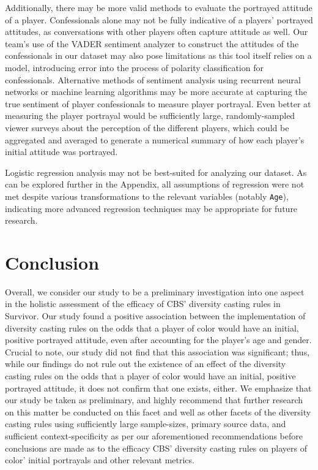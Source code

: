 \documentclass[
  letterpaper,
  DIV=11,
  numbers=noendperiod,
  oneside]{scrartcl}
\begin{document}
Additionally, there may be more valid methods to evaluate the portrayed
attitude of a player. Confessionals alone may not be fully indicative of
a players' portrayed attitudes, as conversations with other players
often capture attitude as well. Our team's use of the VADER sentiment
analyzer to construct the attitudes of the confessionals in our dataset
may also pose limitations as this tool itself relies on a model,
introducing error into the process of polarity classification for
confessionals. Alternative methods of sentiment analysis using recurrent
neural networks or machine learning algorithms may be more accurate at
capturing the true sentiment of player confessionals to measure player
portrayal. Even better at measuring the player portrayal would be
sufficiently large, randomly-sampled viewer surveys about the perception
of the different players, which could be aggregated and averaged to
generate a numerical summary of how each player's initial attitude was
portrayed.

Logistic regression analysis may not be best-suited for analyzing our
dataset. As can be explored further in the Appendix, all assumptions of
regression were not met despite various transformations to the relevant
variables (notably \texttt{Age}), indicating more advanced regression
techniques may be appropriate for future research.

\hypertarget{conclusion}{%
\section{Conclusion}\label{conclusion}}

Overall, we consider our study to be a preliminary investigation into
one aspect in the holistic assessment of the efficacy of CBS' diversity
casting rules in Survivor. Our study found a positive association
between the implementation of diversity casting rules on the odds that a
player of color would have an initial, positive portrayed attitude, even
after accounting for the player's age and gender. Crucial to note, our
study did not find that this association was significant; thus, while
our findings do not rule out the existence of an effect of the diversity
casting rules on the odds that a player of color would have an initial,
positive portrayed attitude, it does not confirm that one exists,
either. We emphasize that our study be taken as preliminary, and highly
recommend that further research on this matter be conducted on this
facet and well as other facets of the diversity casting rules using
sufficiently large sample-sizes, primary source data, and sufficient
context-specificity as per our aforementioned recommendations before
conclusions are made as to the efficacy CBS' diversity casting rules on
players of color' initial portrayals and other relevant metrics.
\end{document}
